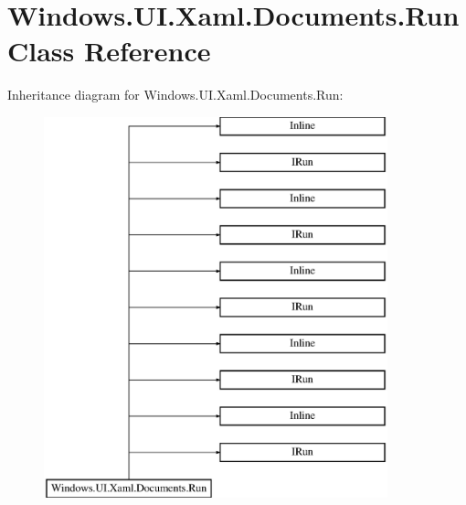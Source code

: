 \hypertarget{class_windows_1_1_u_i_1_1_xaml_1_1_documents_1_1_run}{}\section{Windows.\+U\+I.\+Xaml.\+Documents.\+Run Class Reference}
\label{class_windows_1_1_u_i_1_1_xaml_1_1_documents_1_1_run}
Inheritance diagram for Windows.\+U\+I.\+Xaml.\+Documents.\+Run\+:\begin{figure}[H]
\begin{center}
\leavevmode
\includegraphics[height=11.000000cm]{class_windows_1_1_u_i_1_1_xaml_1_1_documents_1_1_run}
\end{center}
\end{figure}
